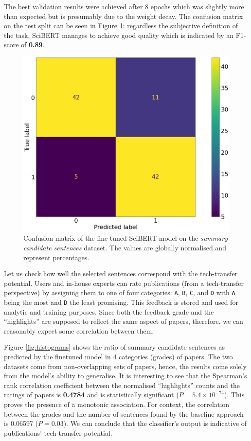 The best validation results were achieved after 8 epochs which was slightly more than expected but is presumably due to the weight decay. The confusion matrix on the test split can be seen in Figure \ref{fig:scibert-confusion}: regardless the subjective definition of the task, SciBERT manages to achieve good quality which is indicated by an F1-score of \textbf{0.89}.

\begin{figure}
    \centering
    \includegraphics[width=0.4\linewidth]{figures/scibert-confusion.png}
    \captionsetup{width=.9\linewidth}
    \caption{Confusion matrix of the fine-tuned SciBERT model on the \textit{summary candidate sentences} dataset. The values are globally normalised and represent percentages.}
    \label{fig:scibert-confusion}
\end{figure}

Let us check how well the selected sentences correspond with the tech-transfer potential. Users and in-house experts can rate publications (from a tech-transfer perspective) by assigning them to one of four categories: \texttt{A}, \texttt{B}, \texttt{C}, and \texttt{D} with \texttt{A} being the most and \texttt{D} the least promising. This feedback is stored and used for analytic and training purposes. Since both the feedback grade and the ``highlights'' are supposed to reflect the same aspect of papers, therefore, we can reasonably expect some correlation between them.

Figure \ref{fig:histograms} shows the ratio of summary candidate sentences as predicted by the finetuned model in 4 categories (grades) of papers. The two datasets come from non-overlapping sets of papers, hence, the results come solely from the model's ability to generalise. It is interesting to see that the Spearman's rank correlation coefficient \cite{spearman1961proof} between the normalised ``highlights'' counts and the ratings of papers is \textbf{0.4784} and is statistically significant ($P = 5.4 \times 10^{-74}$). This proves the presence of a monotonic association. For context, the correlation between the grades and the number of sentences found by the baseline approach is 0.06597 ($P = 0.03$). We can conclude that the classifier's output is indicative of publications' tech-transfer potential. 

